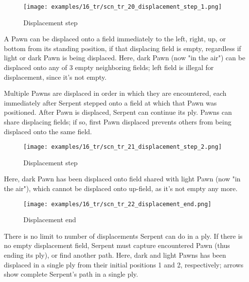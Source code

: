 \vspace*{1.3\baselineskip}
\noindent
\begin{wrapfigure}[11]{l}{0.4\textwidth}
\centering
\texttt{[image: examples/16\_tr/scn\_tr\_20\_displacement\_step\_1.png]}
\vspace*{-0.5\baselineskip}
\caption{Displacement step}
\label{fig:scn_tr_20_displacement_step_1}
\end{wrapfigure}
A Pawn can be displaced onto a field immediately to the left, right, up, or bottom
from its standing position, if that displacing field is empty, regardless if light
or dark Pawn is being displaced.\newline
\indent
Here, dark Pawn (now "in the air") can be displaced onto any of 3 empty neighboring
fields; left field is illegal for displacement, since it's not empty.

\vspace*{-0.8\baselineskip}
\mbox{}\newline %
Multiple Pawns are displaced in order in which they are encountered, each immediately
after Serpent stepped onto a field at which that Pawn was positioned. After Pawn is
displaced, Serpent can continue its ply. Pawns can share displacing fields; if so,
first Pawn displaced prevents others from being displaced onto the same field.

\clearpage %

\noindent
\begin{wrapfigure}[5]{l}{0.4\textwidth}
\centering
\texttt{[image: examples/16\_tr/scn\_tr\_21\_displacement\_step\_2.png]}
\vspace*{-0.5\baselineskip}
\caption{Displacement step}
\label{fig:scn_tr_21_displacement_step_2}
\end{wrapfigure}
Here, dark Pawn has been displaced onto field shared with light Pawn (now "in the air"),
which cannot be displaced onto up-field, as it's not empty any more.

\vspace*{5.1\baselineskip}

\noindent
\begin{wrapfigure}[11]{l}{0.4\textwidth}
\centering
\texttt{[image: examples/16\_tr/scn\_tr\_22\_displacement\_end.png]}
\vspace*{-0.5\baselineskip}
\caption{Displacement end}
\label{fig:scn_tr_22_displacement_end}
\end{wrapfigure}
\indent
There is no limit to number of displacements Serpent can do in a ply. If there is no
empty displacement field, Serpent must capture encountered Pawn (thus ending its ply),
or find another path.\newline
\indent
Here, dark and light Pawns has been displaced in a single ply from their initial positions
1 and 2, respectively; arrows show complete Serpent's path in a single ply.

